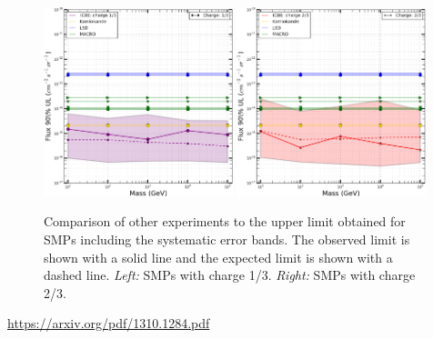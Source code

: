 \begin{figure}
\centering
\includegraphics[width=0.49\textwidth]{chapter8/img/UpperLimitPlot_masses_withunc_0p333333333333}
\includegraphics[width=0.49\textwidth]{chapter8/img/UpperLimitPlot_masses_withunc_0p666666666667}
\caption{Comparison of other experiments to the upper limit obtained for SMPs including the systematic error bands. The observed limit is shown with a solid line and the expected limit is shown with a dashed line. \textit{Left: }SMPs with charge 1/3. \textit{Right: }SMPs with charge 2/3.}
\label{fig:moneyplot2}
\end{figure}



\url{https://arxiv.org/pdf/1310.1284.pdf}



